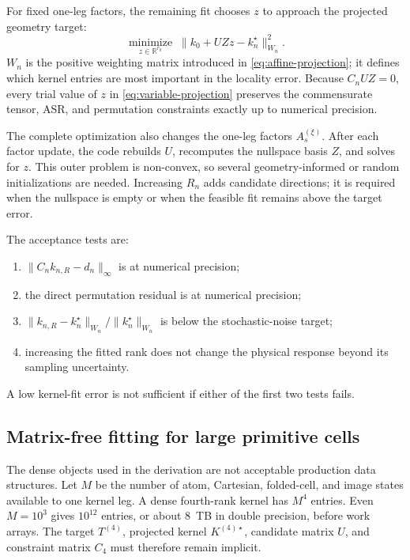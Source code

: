 \documentclass{article}
\begin{document}
For fixed one-leg factors, the remaining fit chooses $z$ to approach the
projected geometry target:
\begin{equation}
    \underset{z\in\mathbb R^{r_0}}{\operatorname{minimize}}\;
    \|k_0+UZz-k_n^\star\|_{W_n}^2.
    \label{eq:variable-projection}
\end{equation}
$W_n$ is the positive weighting matrix introduced in
\autoref{eq:affine-projection}; it defines which kernel entries are most
important in the locality error. Because $C_nUZ=0$, every trial value of
$z$ in \autoref{eq:variable-projection} preserves the commensurate tensor,
ASR, and permutation constraints exactly up to numerical precision.

The complete optimization also changes the one-leg factors
$A_s^{(\xi)}$. After each factor update, the code rebuilds $U$, recomputes
the nullspace basis $Z$, and solves for $z$. This outer problem is
non-convex, so several geometry-informed or random initializations are
needed. Increasing $R_n$ adds candidate directions; it is required when
the nullspace is empty or when the feasible fit remains above the target
error.

The acceptance tests are:
\begin{enumerate}
    \item $\|C_nk_{n,R}-d_n\|_\infty$ is at numerical precision;
    \item the direct permutation residual is at numerical precision;
    \item
    $\|k_{n,R}-k_n^\star\|_{W_n}/\|k_n^\star\|_{W_n}$ is below the
    stochastic-noise target;
    \item increasing the fitted rank does not change the physical response
    beyond its sampling uncertainty.
\end{enumerate}
A low kernel-fit error is not sufficient if either of the first two tests
fails.

\subsection{Matrix-free fitting for large primitive cells}
\label{sec:matrix-free}

The dense objects used in the derivation are not acceptable production
data structures. Let $M$ be the number of atom, Cartesian, folded-cell, and
image states available to one kernel leg. A dense fourth-rank kernel has
$M^4$ entries. Even $M=10^3$ gives $10^{12}$ entries, or about
$8$~TB in double precision, before work arrays. The target
$T^{(4)}$, projected kernel $K^{(4)\star}$, candidate matrix $U$, and
constraint matrix $C_4$ must therefore remain implicit.
\end{document}
